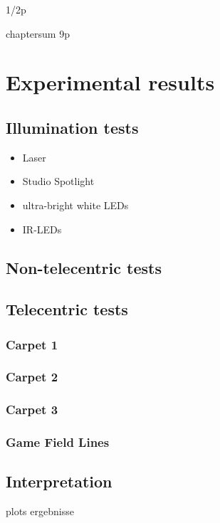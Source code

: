 \documentclass[12pt,a4paper]{article}
\begin{document}
1/2p


chaptersum 9p

\section{Experimental results}

\subsection{Illumination tests}

\begin{itemize}
  \item Laser
  \item Studio Spotlight
  \item ultra-bright white LEDs
  \item IR-LEDs
\end{itemize}

\subsection{Non-telecentric tests}

\subsection{Telecentric tests}

\subsubsection{Carpet 1}

\subsubsection{Carpet 2}

\subsubsection{Carpet 3}

\subsubsection{Game Field Lines}

\subsection{Interpretation}

  plots
  ergebnisse
\end{document}

